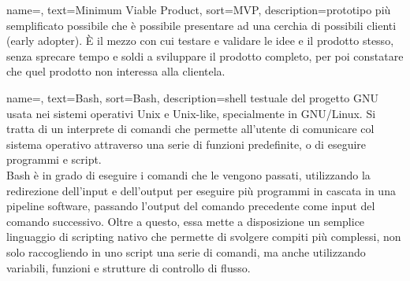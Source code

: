 {
	name=,
	text=Minimum Viable Product,
	sort=MVP,
	description={prototipo più semplificato possibile che è possibile presentare ad una cerchia di possibili clienti (early adopter). È il mezzo con cui testare e validare le idee e il prodotto stesso, senza sprecare tempo e soldi a sviluppare il prodotto completo, per poi constatare che quel prodotto non interessa alla clientela.}
}

{
	name=,
	text=Bash,
	sort=Bash,
	description={shell testuale del progetto GNU usata nei sistemi operativi Unix e Unix-like, specialmente in GNU/Linux. Si tratta di un interprete di comandi che permette all'utente di comunicare col sistema operativo attraverso una serie di funzioni predefinite, o di eseguire programmi e script.\\		
	Bash è in grado di eseguire i comandi che le vengono passati, utilizzando la redirezione dell'input e dell'output per eseguire più programmi in cascata in una pipeline software, passando l'output del comando precedente come input del comando successivo.
	Oltre a questo, essa mette a disposizione un semplice linguaggio di scripting nativo che permette di svolgere compiti più complessi, non solo raccogliendo in uno script una serie di comandi, ma anche utilizzando variabili, funzioni e strutture di controllo di flusso.}
}